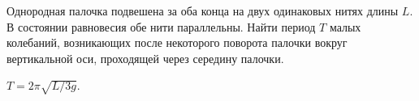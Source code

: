 \complexProblems

\begin{ex} %
Однородная палочка подвешена за оба конца на двух одинаковых нитях длины $L$. В состоянии равновесия обе нити параллельны. Найти период $T$ малых колебаний, возникающих после некоторого поворота палочки вокруг вертикальной оси, проходящей через середину палочки.
\begin{ans}
$T = 2 \pi \sqrt{L/3g}$.
\end{ans}
\end{ex}	

\clearpage
